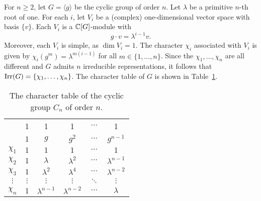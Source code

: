 \begin{example}
    For $n\geq2$, let  
	$G=\langle g\rangle$ be the cyclic group of order $n$. Let $\lambda$ be a primitive $n$-th root of one. For each $i$, 
    let $V_i$ be a (complex) one-dimensional vector space with basis 
	$\{v\}$. Each $V_i$ is a $\mathbb{C}[G]$-module with 
    \[
		g\cdot v=\lambda^{i-1}v.
	\]
	Moreover, each $V_i$ is simple, as $\dim V_i=1$. The character $\chi_i$ associated with 
	$V_i$ is given by $\chi_i(g^m)=\lambda^{m(i-1)}$ for all 
	$m\in\{1,\dots,n\}$. Since the $\chi_1,\dots,\chi_n$ are all different and $G$ admits $n$ irreducible representations,
    it follows that $\operatorname{Irr}(G)=\{\chi_1,\dots,\chi_n\}$. The character
    table of $G$ is shown in Table~\ref{tab:C_n}.
    
    \begin{table}[h]
    \caption{The character table of the cyclic group $C_n$ of order $n$.} 
    \label{tab:C_n}
		\begin{tabular}{|c|ccccc|}
			\hline 
			& 1 & 1 & 1 & $\cdots$ & 1\tabularnewline
			& $1$ & $g$ & $g^2$ & $\cdots$ & $g^{n-1}$\tabularnewline
			\hline 
			$\chi_{1}$ & $1$ & $1$ & $1$ & $\cdots$ & $1$\tabularnewline
			$\chi_{2}$ & $1$ & $\lambda$ & $\lambda^2$ & $\cdots$ & $\lambda^{n-1}$\tabularnewline
			$\chi_{3}$ & $1$ & $\lambda^2$ & $\lambda^4$ & $\cdots$ & $\lambda^{n-2}$\tabularnewline
			$\vdots$ & $\vdots$ & $\vdots$ & $\vdots$ & $\ddots$ & $\vdots$\tabularnewline
			$\chi_{n}$ & $1$ & $\lambda^{n-1}$ & $\lambda^{n-2}$ & $\cdots$ & $\lambda$\tabularnewline
			\hline
		\end{tabular}
	\end{table}
\end{example}

